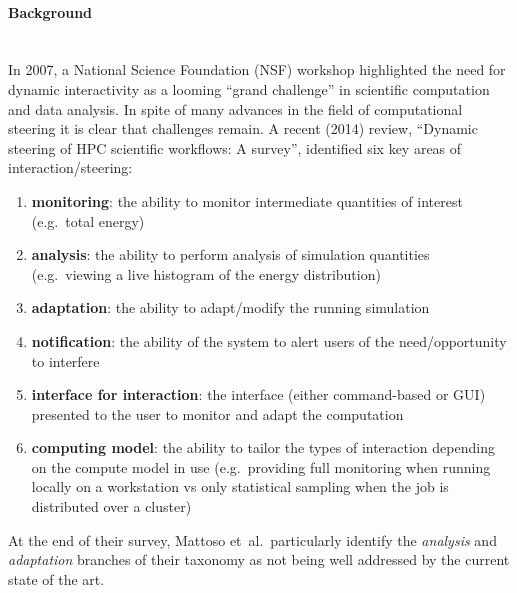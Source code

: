 \documentclass[a4paper,fontsize=12pt]{scrartcl}
\begin{document}
\paragraph*{Background}\mbox{}\\

In 2007, a National Science Foundation (NSF)
workshop\parencite{Gil2007} highlighted the need for dynamic
interactivity as a looming ``grand challenge'' in scientific
computation and data analysis.
In spite of many advances in the field of computational steering it is
clear that challenges remain. A recent (2014) review, ``Dynamic
steering of HPC scientific workflows: A survey''\parencite{Mattoso},
identified six key areas of interaction/steering:
\begin{enumerate}
\item \textbf{monitoring}: the ability to monitor intermediate
  quantities of interest (e.g.~total energy)
\item \textbf{analysis}: the ability to perform analysis of simulation
  quantities (e.g.~viewing a live histogram of the energy
  distribution)
\item \textbf{adaptation}: the ability to adapt/modify the running
  simulation
\item \textbf{notification}: the ability of the system to alert users of the
  need/opportunity to interfere
\item \textbf{interface for interaction}: the interface (either command-based
  or GUI) presented to the user to monitor and adapt the computation
\item \textbf{computing model}: the ability to tailor the types of interaction
  depending on the compute model in use (e.g.~providing full
  monitoring when running locally on a workstation vs only statistical
  sampling when the job is distributed over a cluster)
\end{enumerate}
At the end of their survey, Mattoso et~al.~particularly identify the
\emph{analysis} and \emph{adaptation} branches of their taxonomy as
not being well addressed by the current state of the art.
\end{document}
